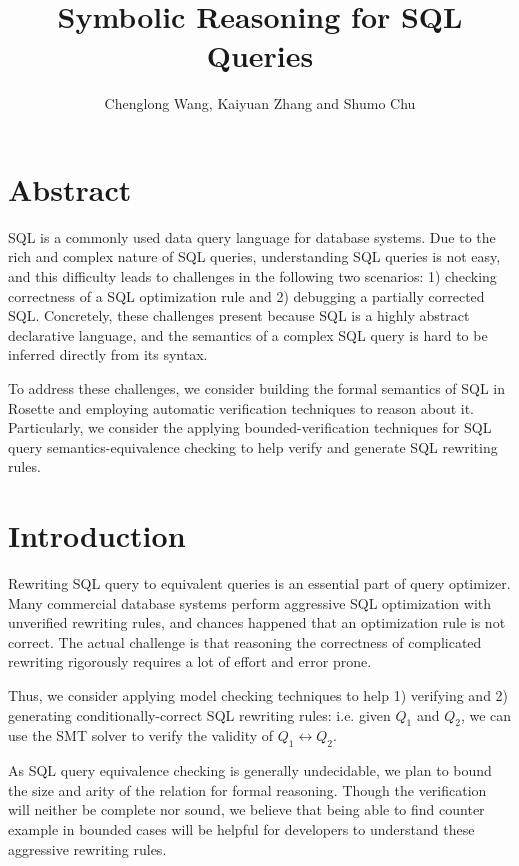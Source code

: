 \documentclass{article}
\begin{document}
\title{Symbolic Reasoning for SQL Queries}
\author{Chenglong Wang, Kaiyuan Zhang and Shumo Chu}
\date{}
\maketitle

\section*{Abstract}
SQL is a commonly used data query language for database systems. Due to the rich and complex nature of SQL queries, understanding SQL queries is not easy, and this difficulty leads to challenges in the following two scenarios: 1) checking correctness of a SQL optimization rule and 2) debugging a partially corrected SQL. Concretely, these challenges present because SQL is a highly abstract declarative language, and the semantics of a complex SQL query is hard to be inferred directly from its syntax.

To address these challenges, we consider building the formal semantics of SQL in Rosette and employing automatic verification techniques to reason about it. Particularly, we consider the applying bounded-verification techniques for SQL query semantics-equivalence checking to help verify and generate SQL rewriting rules.

\section{Introduction}

Rewriting SQL query to equivalent queries is an essential part of query
optimizer. Many commercial database systems perform aggressive SQL optimization with 
unverified rewriting rules, and chances happened that an optimization rule is not correct. 
The actual challenge is that reasoning the correctness of complicated rewriting rigorously 
requires a lot of effort and error prone.

Thus, we consider applying model checking techniques to help 1) verifying and 2) generating conditionally-correct SQL rewriting rules: i.e. 
given $Q_1$ and $Q_2$, we can use the SMT solver to verify the validity of $Q_1 \leftrightarrow Q_2$. 

As SQL query equivalence checking is generally undecidable, we plan to bound the size and arity of the
 relation for formal reasoning. Though the verification will neither be complete nor sound, we believe that being able to find counter example in bounded cases will be helpful for developers to understand these aggressive rewriting rules. 
 
\end{document}
